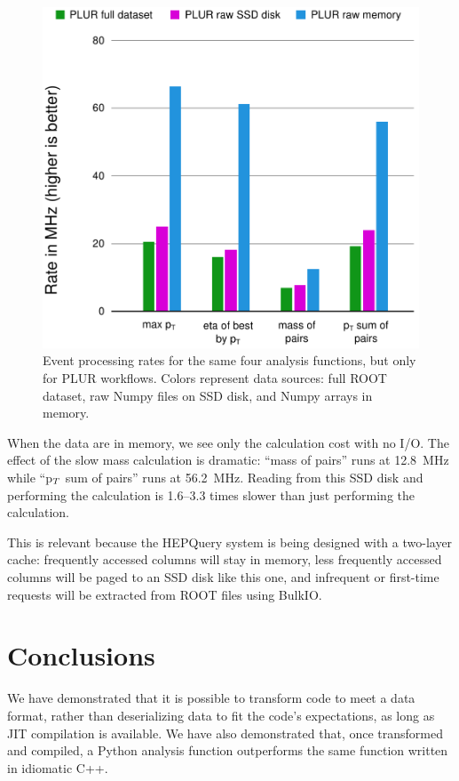 \documentclass[10pt, conference, compsocconf]{IEEEtran}
\begin{document}
\begin{figure}[!t]
\centering
\includegraphics[width=\linewidth]{physical-media.pdf}
\caption{Event processing rates for the same four analysis functions, but only for PLUR workflows. Colors represent data sources: full ROOT dataset, raw Numpy files on SSD disk, and Numpy arrays in memory.}
\label{physical-media}
\end{figure}

When the data are in memory, we see only the calculation cost with no I/O. The effect of the slow mass calculation is dramatic: ``mass of pairs'' runs at 12.8~MHz while ``p$_{\mbox{\scriptsize T}}$ sum of pairs'' runs at 56.2~MHz. Reading from this SSD disk and performing the calculation is 1.6--3.3 times slower than just performing the calculation.

This is relevant because the HEPQuery system is being designed with a two-layer cache: frequently accessed columns will stay in memory, less frequently accessed columns will be paged to an SSD disk like this one, and infrequent or first-time requests will be extracted from ROOT files using BulkIO.

\section{Conclusions}

We have demonstrated that it is possible to transform code to meet a data format, rather than deserializing data to fit the code's expectations, as long as JIT compilation is available. We have also demonstrated that, once transformed and compiled, a Python analysis function outperforms the same function written in idiomatic C++.
\end{document}
